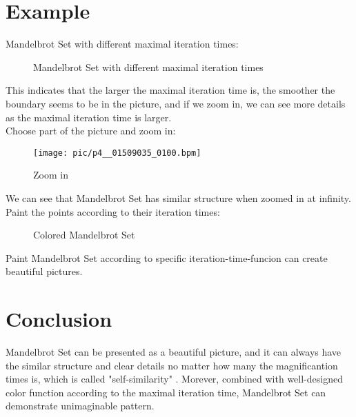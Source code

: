\documentclass{ctexart}
\begin{document}
\section{Example}

Mandelbrot Set with different maximal iteration times:

\begin{figure}[htbp]
\centering
{}
\quad
{}
\quad
{}
\caption{Mandelbrot Set with different maximal iteration times}
\end{figure}

This indicates that the larger the maximal iteration time is, the smoother the boundary seems to be in the picture, and if we zoom in, we can see more details as the maximal iteration time is larger.\\

Choose part of the picture and zoom in:

\vspace{-1.8cm}
\begin{figure}[htbp]
  \centering
  \texttt{[image: pic/p4\_\_01509035\_0100.bpm]} \label{4}
  \caption{Zoom in}
\end{figure}

We can see that Mandelbrot Set has similar structure when zoomed in at infinity.\\

Paint the points according to their iteration times:

\begin{figure}[htbp]
\centering
{}
\quad
{}
\caption{Colored Mandelbrot Set}
\end{figure}

Paint Mandelbrot Set according to specific iteration-time-funcion can create beautiful pictures.

\section{Conclusion}
Mandelbrot Set can be presented as a beautiful picture, and it can always have the similar structure and clear details no matter how many the magnificantion times is, which is called "self-similarity" \cite{H41}.
Morever, combined with well-designed color function according to the maximal iteration time, Mandelbrot Set can demonstrate unimaginable pattern.



\end{document}
